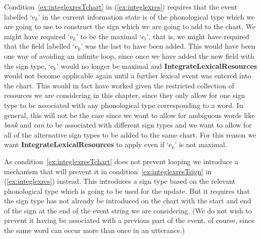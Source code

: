 Condition~\ref{ex:integlexresTchart} in (\ref{ex:integlexres})
requires that the event labelled `e$_k$' in the current information
state is of the phonological type which we are going to use to construct
the sign which we are going to add to the chart.  We might have required
`e$_k$' to be the maximal `e$_i$', that is, we might have required
that the field labelled `e$_k$' was the last to have been added.  This
would have been one way of avoiding an infinite loop, since once we
have added the new field with the sign type, `e$_k$' would no longer
be maximal and \textbf{IntegrateLexicalResources} would not become
applicable again until a further lexical event was entered into the
chart.  This would in fact have worked given the restricted collection
of resources we are considering in this chapter, since they only allow
for one sign type to be associated with any phonological type
corresponding to a word.  In general, this will not be the case since
we want to allow for ambiguous words like \textit{bank} and
\textit{can} to be associated with different sign types and we want to
allow for all of the alternative sign types to be added to the same
chart.  For this reason we want \textbf{IntegrateLexicalResources} to
apply even if `e$_k$' is not maximal.

As condition~\ref{ex:integlexresTchart} does not prevent looping we
introduce a mechanism that will prevent it in
condition~\ref{ex:integlexresTsign} in (\ref{ex:integlexres})
instead.  This introduces a sign type based on the relevant
phonological type which is going to be used for the update.  But it
requires that the sign type has not already be introduced on the chart
with the start and end of the sign at the end of the event string we
are considering.  (We do not wish to prevent it having be associated
with a previous part of the event, of course, since the same word can
occur more than once in an utterance.)

